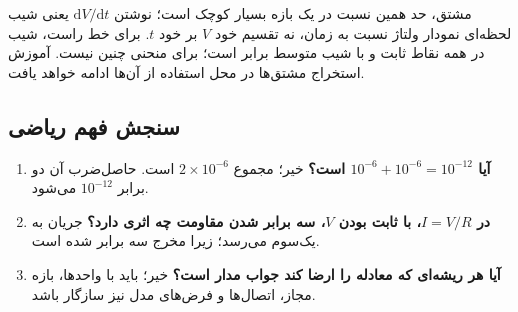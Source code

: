 مشتق، حد همین نسبت در یک بازه بسیار کوچک است؛ نوشتن \(\mathrm{d}V/\mathrm{d}t\)
یعنی شیب لحظه‌ای نمودار ولتاژ نسبت به زمان، نه تقسیم خود \(V\) بر خود \(t\).
برای خط راست، شیب در همه نقاط ثابت و با شیب متوسط برابر است؛ برای منحنی چنین نیست.
آموزش استخراج مشتق‌ها در محل استفاده از آن‌ها ادامه خواهد یافت.

\subsection{سنجش فهم ریاضی}
\begin{enumerate}
\item \textbf{آیا \(10^{-6}+10^{-6}=10^{-12}\) است؟}
خیر؛ مجموع \(2\times10^{-6}\) است. حاصل‌ضرب آن دو برابر \(10^{-12}\) می‌شود.
\item \textbf{در \(I=V/R\)، با ثابت بودن \(V\)، سه برابر شدن مقاومت چه اثری دارد؟}
جریان به یک‌سوم می‌رسد؛ زیرا مخرج سه برابر شده است.
\item \textbf{آیا هر ریشه‌ای که معادله را ارضا کند جواب مدار است؟}
خیر؛ باید با واحدها، بازه مجاز، اتصال‌ها و فرض‌های مدل نیز سازگار باشد.
\end{enumerate}
